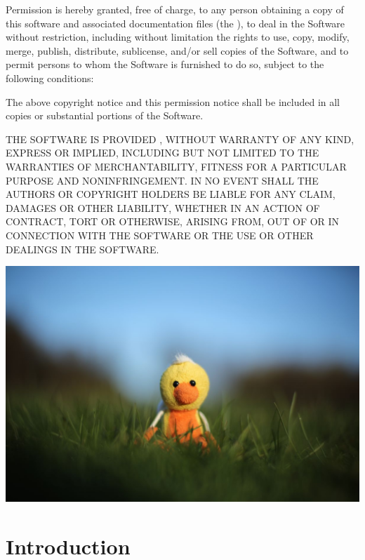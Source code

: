 \documentclass{scrartcl}
\numberwithin{figure}{subsection}
\begin{document}
Permission is hereby granted, free of charge, to any person obtaining a copy of this software and associated documentation files (the ), to deal in the Software without restriction, including without limitation the rights to use, copy, modify, merge, publish, distribute, sublicense, and/or sell copies of the Software, and to permit persons to whom the Software is furnished to do so, subject to the following conditions:

The above copyright notice and this permission notice shall be included in all copies or substantial portions of the Software.

THE SOFTWARE IS PROVIDED , WITHOUT WARRANTY OF ANY KIND, EXPRESS OR IMPLIED, INCLUDING BUT NOT LIMITED TO THE WARRANTIES OF MERCHANTABILITY, FITNESS FOR A PARTICULAR PURPOSE AND NONINFRINGEMENT. IN NO EVENT SHALL THE AUTHORS OR COPYRIGHT HOLDERS BE LIABLE FOR ANY CLAIM, DAMAGES OR OTHER LIABILITY, WHETHER IN AN ACTION OF CONTRACT, TORT OR OTHERWISE, ARISING FROM, OUT OF OR IN CONNECTION WITH THE SOFTWARE OR THE USE OR OTHER DEALINGS IN THE SOFTWARE.

\begin{center}
    \includegraphics[width=\textwidth]{duck-large2}
\end{center}

\pagebreak{}

\tableofcontents{}

\pagebreak{}

\section*{Introduction}
\end{document}
